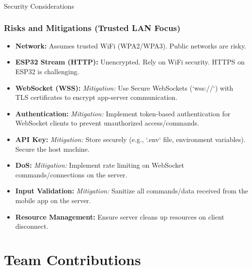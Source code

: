 \documentclass{beamer}
\begin{document}
\begin{frame}{Security Considerations}
    \frametitle{Risks and Mitigations (Trusted LAN Focus)}
     \begin{itemize}
        \item \textbf{Network:} Assumes trusted WiFi (WPA2/WPA3). Public networks are risky.
        \item \textbf{ESP32 Stream (HTTP):} Unencrypted. Rely on WiFi security. HTTPS on ESP32 is challenging.
        \item \textbf{WebSocket (WSS):} \textit{Mitigation:} Use Secure WebSockets (`wss://`) with TLS certificates to encrypt app-server communication.
        \item \textbf{Authentication:} \textit{Mitigation:} Implement token-based authentication for WebSocket clients to prevent unauthorized access/commands.
        \item \textbf{API Key:} \textit{Mitigation:} Store securely (e.g., `.env` file, environment variables). Secure the host machine.
        \item \textbf{DoS:} \textit{Mitigation:} Implement rate limiting on WebSocket commands/connections on the server.
        \item \textbf{Input Validation:} \textit{Mitigation:} Sanitize all commands/data received from the mobile app on the server.
        \item \textbf{Resource Management:} Ensure server cleans up resources on client disconnect.
     \end{itemize}
\end{frame}




\section{Team Contributions}
\end{document}
